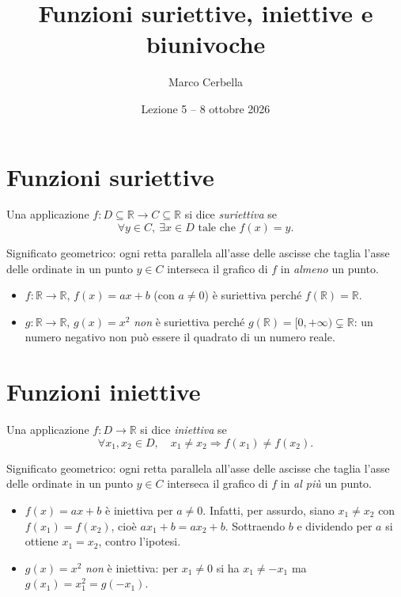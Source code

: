 \documentclass[11pt,a4paper]{article}
\title{Funzioni suriettive, iniettive e biunivoche}
\author{Marco Cerbella}
\date{Lezione 5 -- 8 ottobre 2026}
\begin{document}
\maketitle

\section{Funzioni suriettive}

\begin{definizione}
Una applicazione $f : D \subseteq \mathbb{R} \to C \subseteq \mathbb{R}$ si dice \emph{suriettiva} se
\[
\forall y \in C, \ \exists x \in D \text{ tale che } f(x) = y.
\]
\end{definizione}

Significato geometrico: ogni retta parallela all'asse delle ascisse che taglia l'asse delle ordinate in un punto $y \in C$ interseca il grafico di $f$ in \emph{almeno} un punto.

\begin{esempio}
\leavevmode
\begin{itemize}
    \item $f : \mathbb{R} \to \mathbb{R}$, $f(x) = ax + b$ (con $a \neq 0$) è suriettiva perché $f(\mathbb{R}) = \mathbb{R}$.
    \item $g : \mathbb{R} \to \mathbb{R}$, $g(x) = x^2$ \emph{non} è suriettiva perché $g(\mathbb{R}) = [0, +\infty) \subsetneq \mathbb{R}$: un numero negativo non può essere il quadrato di un numero reale.
\end{itemize}
\end{esempio}

\section{Funzioni iniettive}

\begin{definizione}
Una applicazione $f : D \to \mathbb{R}$ si dice \emph{iniettiva} se
\[
\forall x_1, x_2 \in D, \quad x_1 \neq x_2 \Rightarrow f(x_1) \neq f(x_2).
\]
\end{definizione}

Significato geometrico: ogni retta parallela all'asse delle ascisse che taglia l'asse delle ordinate in un punto $y \in C$ interseca il grafico di $f$ in \emph{al più} un punto.

\begin{esempio}
\leavevmode
\begin{itemize}
    \item $f(x) = ax + b$ è iniettiva per $a \neq 0$. Infatti, per assurdo, siano $x_1 \neq x_2$ con $f(x_1) = f(x_2)$, cioè $a x_1 + b = a x_2 + b$. Sottraendo $b$ e dividendo per $a$ si ottiene $x_1 = x_2$, contro l'ipotesi.
    \item $g(x) = x^2$ \emph{non} è iniettiva: per $x_1 \neq 0$ si ha $x_1 \neq -x_1$ ma $g(x_1) = x_1^2 = g(-x_1)$.
\end{itemize}
\end{esempio}
\end{document}
